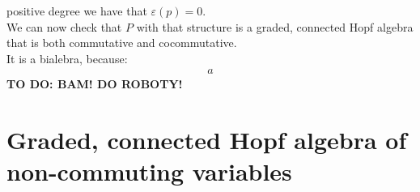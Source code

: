 \documentclass[a4paper, 12pt]{report}
\newcommand{\todo}[1]{\hfill \break \textbf{\Huge TO DO: #1 \hfill \break}\normalsize}
\begin{document}
positive degree we have that $\varepsilon(p) = 0$. \\
We can now check that $P$ with that structure is a graded, connected Hopf algebra that is both commutative
and cocommutative. \\
It is a bialebra, because:
\begin{align*}
a
\end{align*}
\todo{BAM! DO ROBOTY!}
\section{Graded, connected Hopf algebra of non-commuting variables}
\end{document}
